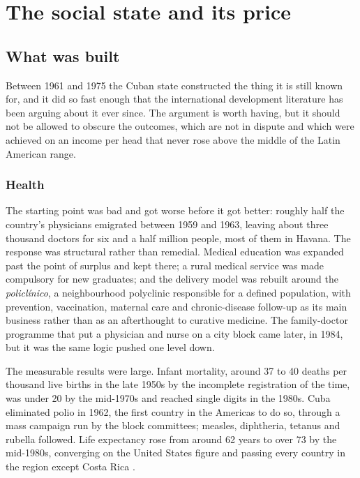 \chapter{The social state and its price}
\label{ch:socialstate}

\section{What was built}

Between 1961 and 1975 the Cuban state constructed the thing it is still known
for, and it did so fast enough that the international development literature
has been arguing about it ever since. The argument is worth having, but it
should not be allowed to obscure the outcomes, which are not in dispute and
which were achieved on an income per head that never rose above the middle of
the Latin American range.

\subsection{Health}

The starting point was bad and got worse before it got better: roughly half the
country's physicians emigrated between 1959 and 1963, leaving about three
thousand doctors for six and a half million people, most of them in Havana. The
response was structural rather than remedial. Medical education was expanded
past the point of surplus and kept there; a rural medical service was made
compulsory for new graduates; and the delivery model was rebuilt around the
\emph{policl\'inico}, a neighbourhood polyclinic responsible for a defined
population, with prevention, vaccination, maternal care and chronic-disease
follow-up as its main business rather than as an afterthought to curative
medicine. The family-doctor programme that put a physician and nurse on a city
block came later, in 1984, but it was the same logic pushed one level down.

The measurable results were large. Infant mortality, around 37 to 40 deaths per
thousand live births in the late 1950s by the incomplete registration of the
time, was under 20 by the mid-1970s and reached single digits in the
1980s.\unv{} Cuba eliminated polio in 1962, the first country in the Americas to
do so, through a mass campaign run by the block committees; measles,
diphtheria, tetanus and rubella followed. Life expectancy rose from around 62
years to over 73 by the mid-1980s, converging on the United States figure and
passing every country in the region except Costa Rica \citep{onei,feinsilver1993}.\unv{}

